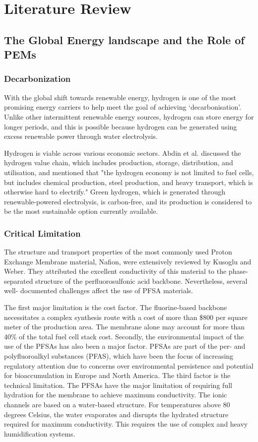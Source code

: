 \documentclass[12pt,a4paper]{report}
\begin{document}
\chapter{Literature Review}

\section{The Global Energy landscape and the Role of PEMs}
\subsection{Decarbonization}
With the global shift towards renewable energy, hydrogen is one of the most promising energy carriers to help meet the goal of achieving ‘decarbonisation’. Unlike other intermittent renewable energy sources, hydrogen can store energy for longer periods, and this is possible because hydrogen can be generated using excess renewable power through water electrolysis.\cite{22,23}

Hydrogen is viable across various economic sectors. Abdin et al. discussed the hydrogen value chain, which includes production, storage, distribution, and utilisation, and mentioned that "the hydrogen economy is not limited to fuel cells, but includes chemical production, steel production, and heavy transport, which is otherwise hard to electrify."\cite{22} Green hydrogen, which is generated through renewable-powered electrolysis, is carbon-free, and its production is considered to be the most sustainable option currently available.

\subsection{Critical Limitation}
The structure and transport properties of the most commonly used Proton Exchange Membrane material, Nafion, were extensively reviewed by Kusoglu and Weber. They attributed the excellent conductivity of this material to the phase-separated structure of the perfluorosulfonic acid backbone.\cite{24} Nevertheless, several well- documented challenges affect the use of PFSA materials.

The first major limitation is the cost factor. The fluorine-based backbone necessitates a complex synthesis route with a cost of more than \$800 per square meter of the production area. The membrane alone may account for more than 40\% of the total fuel cell stack cost.\cite{1,4} Secondly, the environmental impact of the use of the PFSAs has also been a major factor. PFSAs are part of the per- and polyfluoroalkyl substances (PFAS), which have been the focus of increasing regulatory attention due to concerns over environmental persistence and potential for bioaccumulation in Europe and North America.\cite{24} The third factor is the technical limitation. The PFSAs have the major limitation of requiring full hydration for the membrane to achieve maximum conductivity. The ionic channels are based on a water-based structure.\cite{5} For temperatures above 80 degrees Celsius, the water evaporates and disrupts the hydrated structure required for maximum conductivity. This requires the use of complex and heavy humidification systems.\cite{3,4}
\end{document}
